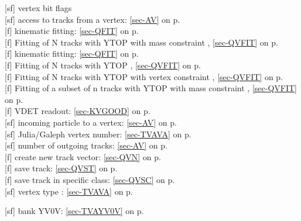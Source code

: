  [sf] vertex bit flags\\
 [sf] access to tracks from a vertex: \ref{sec-AV} on p.~\pageref{sec-AV}\\
 [f] kinematic fitting: \ref{sec-QFIT} on p.~\pageref{sec-QFIT}\\
 [f] Fitting of N tracks with YTOP with mass constraint ,
 \ref{sec-QVFIT} on p.~\pageref{sec-QVFIT}\\
 [f] kinematic fitting: \ref{sec-QFIT} on p.~\pageref{sec-QFIT}\\
 [f] Fitting of N tracks with YTOP ,
 \ref{sec-QVFIT} on p.~\pageref{sec-QVFIT}\\
 [f] Fitting of N tracks with YTOP with vertex constraint ,
 \ref{sec-QVFIT} on p.~\pageref{sec-QVFIT}\\
 [f] Fitting of a subset of n tracks with YTOP with mass constraint ,
 \ref{sec-QVFIT} on p.~\pageref{sec-QVFIT}\\
 [f] VDET readout: \ref{sec-KVGOOD} on p.~\pageref{sec-KVGOOD}\\
 [sf] incoming particle to a vertex: \ref{sec-AV} on p.~\pageref{sec-AV}\\
 [sf] Julia/Galeph vertex number: \ref{sec-TVAVA} on p.~\pageref{sec-TVAVA}\\
 [sf] number of outgoing tracks: \ref{sec-AV} on p.~\pageref{sec-AV}\\
 [f] create new track vector: \ref{sec-QVN} on p.~\pageref{sec-QVN}\\
 [f] save track: \ref{sec-QVST} on p.~\pageref{sec-QVST}\\
 [f] save track in specific class:
 \ref{sec-QVSC} on p.~\pageref{sec-QVSC}\\
 [sf] vertex type : \ref{sec-TVAVA} on p.~\pageref{sec-TVAVA}
 
 [sf] bank YV0V: \ref{sec-TVAYV0V} on p.~\pageref{sec-TVAYV0V}
 
